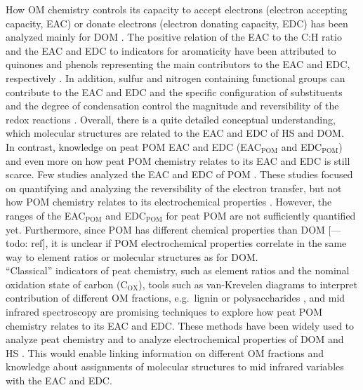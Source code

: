 \documentclass[alpha-refs, lineno]{wiley-article-rmd}
\begin{document}
How OM chemistry controls its capacity to accept electrons (electron accepting capacity, EAC) or donate electrons (electron donating capacity, EDC) has been analyzed mainly for DOM \autocite{Ratasuk.2007,Aeschbacher.2010,Aeschbacher.2012,Fimmen.2007,HernandezMontoya.2012,Tan.2017,Walpen.2018,LaCroix.2020}. The positive relation of the EAC to the C:H ratio and the EAC and EDC to indicators for aromaticity have been attributed to quinones and phenols representing the main contributors to the EAC and EDC, respectively \autocite{Aeschbacher.2010,Tan.2017}. In addition, sulfur and nitrogen containing functional groups can contribute to the EAC and EDC \autocite{Fimmen.2007,Ratasuk.2007,HernandezMontoya.2012} and the specific configuration of substituents and the degree of condensation control the magnitude and reversibility of the redox reactions \autocite{Ratasuk.2007,Uchimiya.2009}. Overall, there is a quite detailed conceptual understanding, which molecular structures are related to the EAC and EDC of HS and DOM.\\
In contrast, knowledge on peat POM EAC and EDC (EAC\(_\text{POM}\) and EDC\(_\text{POM}\)) and even more on how peat POM chemistry relates to its EAC and EDC is still scarce. Few studies analyzed the EAC and EDC of POM \autocite{Keller.2013,Lau.2015,Lau.2016,Gao.2019}. These studies focused on quantifying and analyzing the reversibility of the electron transfer, but not how POM chemistry relates to its electrochemical properties \autocite{Keller.2013,Lau.2015,Lau.2016,Gao.2019}. However, the ranges of the EAC\(_\text{POM}\) and EDC\(_\text{POM}\) for peat POM are not sufficiently quantified yet. Furthermore, since POM has different chemical properties than DOM \autocite{Worrall.2017} {[}--- todo: ref{]}, it is unclear if POM electrochemical properties correlate in the same way to element ratios or molecular structures as for DOM.\\
``Classical'' indicators of peat chemistry, such as element ratios and the nominal oxidation state of carbon (C\(_\text{OX}\)), tools such as van-Krevelen diagrams to interpret contribution of different OM fractions, e.g.~lignin or polysaccharides \autocite{Kim.2003}, and mid infrared spectroscopy are promising techniques to explore how peat POM chemistry relates to its EAC and EDC. These methods have been widely used to analyze peat chemistry and to analyze electrochemical properties of DOM and HS \autocite{Worrall.2017,Leifeld.2012,Bader.2018,Moore.2018,Leifeld.2020,Cocozza.2003,Artz.2008,Hodgkins.2018,Tfaily.2014,Aeschbacher.2010,Aeschbacher.2012,Tan.2017,Lv.2018,LaCroix.2020}. This would enable linking information on different OM fractions and knowledge about assignments of molecular structures to mid infrared variables with the EAC and EDC.\\
\end{document}
